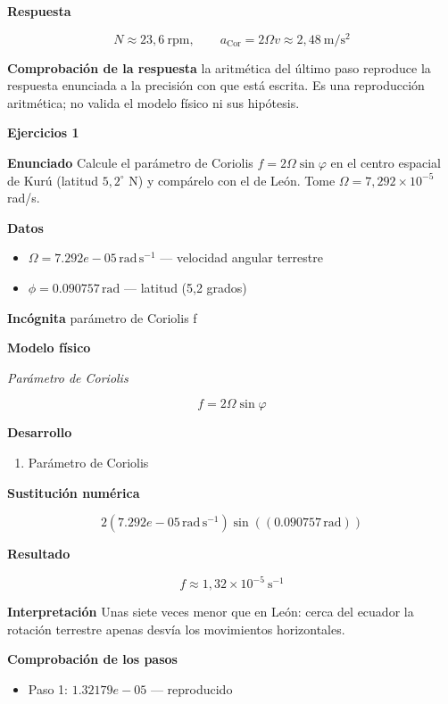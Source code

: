 \documentclass[10pt,openany]{book}
\begin{document}
\noindent\textbf{Respuesta}

\[
N \approx 23{,}6\ \mathrm{rpm},\qquad a_{\mathrm{Cor}} = 2\Omega v \approx 2{,}48\ \mathrm{m/s^{2}}
\]

\noindent\textbf{Comprobación de la respuesta} la aritmética del último paso reproduce la respuesta enunciada a la precisión con que está escrita. Es una reproducción aritmética; no valida el modelo físico ni sus hipótesis.

\noindent\textbf{Ejercicios 1}

\noindent\textbf{Enunciado}
Calcule el parámetro de Coriolis \(f = 2\Omega\sin\varphi\) en el centro espacial de Kurú (latitud \(5{,}2^\circ\) N) y compárelo con el de León. Tome \(\Omega = 7{,}292\times 10^{-5}\) rad/s.

\noindent\textbf{Datos}
\begin{itemize}
\item $\Omega = 7.292e-05\,\mathrm{rad}\,\mathrm{s}^{-1}$ — velocidad angular terrestre
\item $\phi = 0.090757\,\mathrm{rad}$ — latitud (5,2 grados)
\end{itemize}

\noindent\textbf{Incógnita}
parámetro de Coriolis f

\noindent\textbf{Modelo físico}

\noindent\textit{Parámetro de Coriolis}

\[
f = 2\Omega\sin\varphi
\]

\noindent\textbf{Desarrollo}
\begin{enumerate}
\item
Parámetro de Coriolis
\end{enumerate}

\noindent\textbf{Sustitución numérica}

\[
2 \left(7.292e-05\,\mathrm{rad}\,\mathrm{s}^{-1}\right) \sin{\left(\left(0.090757\,\mathrm{rad}\right) \right)}
\]

\noindent\textbf{Resultado}

\[
f \approx 1{,}32\times 10^{-5}\ \mathrm{s^{-1}}
\]

\noindent\textbf{Interpretación}
Unas siete veces menor que en León: cerca del ecuador la rotación terrestre apenas desvía los movimientos horizontales.

\noindent\textbf{Comprobación de los pasos}
\begin{itemize}
\item Paso 1: $1.32179e-05$ — reproducido
\end{itemize}
\end{document}
